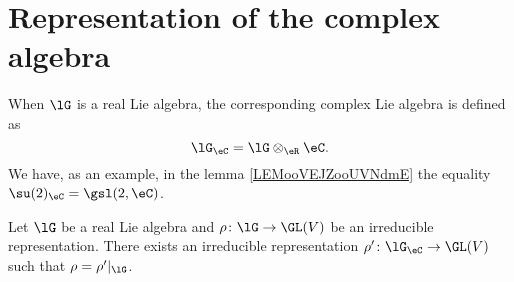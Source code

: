 \section{Representation of the complex algebra}

When \(\lG \) is a real Lie algebra, the corresponding complex Lie algebra is defined as
\begin{equation}
	\lG_{\eC}=\lG\otimes_{\eR}\eC.
\end{equation}
We have, as an example, in the lemma \ref{LEMooVEJZooUVNdmE} the equality $\su(2)_{\eC}=\gsl(2,\eC)$.

\begin{lemma}        \label{LEMooIGAFooTSUsJR}
	Let \( \lG\) be a real Lie algebra and \( \rho\colon \lG\to \GL(V)\) be an irreducible representation. There exists an irreducible representation \( \rho'\colon \lG_{\eC}\to \GL(V)\) such that \( \rho=\rho'|_{\lG}\).
\end{lemma}

